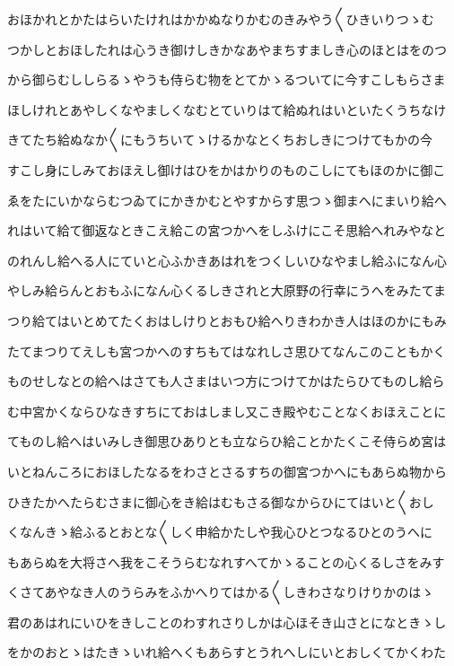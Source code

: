 \documentclass[a4paper,11pt,landscape]{ltjtarticle}
\begin{document}
おほかれとかたはらいたけれはかかぬなりかむのきみやう〱ひきいりつゝむ
\par\medskip
つかしとおほしたれは心うき御けしきかなあやまちすましき心のほとはをのつ
\par\medskip
から御らむししらるゝやうも侍らむ物をとてかゝるついてに今すこしもらさま
\par\medskip
ほしけれとあやしくなやましくなむとていりはて給ぬれはいといたくうちなけ
\par\medskip
きてたち給ぬなか〱にもうちいてゝけるかなとくちおしきにつけてもかの今
\par\medskip
すこし身にしみておほえし御けはひをかはかりのものこしにてもほのかに御こ
\par\medskip
ゑをたにいかならむつゐてにかきかむとやすからす思つゝ御まへにまいり給へ
\par\medskip
れはいて給て御返なときこえ給この宮つかへをしふけにこそ思給へれみやなと
\par\medskip
のれんし給へる人にていと心ふかきあはれをつくしいひなやまし給ふになん心
\par\medskip
やしみ給らんとおもふになん心くるしきされと大原野の行幸にうへをみたてま
\par\medskip
つり給てはいとめてたくおはしけりとおもひ給へりきわかき人はほのかにもみ
\par\medskip
たてまつりてえしも宮つかへのすちもてはなれしさ思ひてなんこのこともかく
\par\medskip
ものせしなとの給へはさても人さまはいつ方につけてかはたらひてものし給ら
\par\medskip
む中宮かくならひなきすちにておはしまし又こき殿やむことなくおほえことに
\par\medskip
てものし給へはいみしき御思ひありとも立ならひ給ことかたくこそ侍らめ宮は
\par\medskip
いとねんころにおほしたなるをわさとさるすちの御宮つかへにもあらぬ物から
\par\medskip
ひきたかへたらむさまに御心をき給はむもさる御なからひにてはいと〱おし
\par\medskip
くなんきゝ給ふるとおとな〱しく申給かたしや我心ひとつなるひとのうへに
\par\medskip
もあらぬを大将さへ我をこそうらむなれすへてかゝることの心くるしさをみす
\par\medskip
くさてあやなき人のうらみをふかへりてはかる〱しきわさなりけりかのはゝ
\par\medskip
君のあはれにいひをきしことのわすれさりしかは心ほそき山さとになときゝし
\par\medskip
をかのおとゝはたきゝいれ給へくもあらすとうれへしにいとおしくてかくわた
\end{document}
